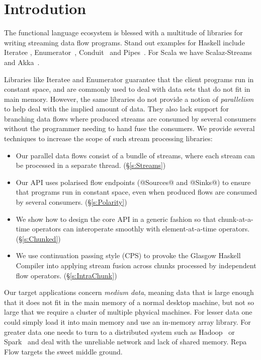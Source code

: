 \section{Introdution}

The functional language ecosystem is blessed with a multitude of libraries for writing streaming data flow programs. Stand out examples for Haskell include Iteratee \cite{Kiselyov:iteratee}, Enumerator~\cite{hackage:enumerator}, Conduit~\cite{hackage:conduit} and Pipes~\cite{hackage:pipes}. For Scala we have Scalaz-Streams~\cite{github:scalaz-streams} and Akka~\cite{github:akka}.

Libraries like Iteratee and Enumerator guarantee that the client programs run in constant space, and are commonly used to deal with data sets that do not fit in main memory. However, the same libraries do not provide a notion of \emph{parallelism} to help deal with the implied amount of data. They also lack support for branching data flows where produced streams are consumed by several consumers without the programmer needing to hand fuse the consumers. We provide several techniques to increase the scope of such stream processing libraries:

\begin{itemize}
\item Our parallel data flows consist of a bundle of streams, where each stream can be processed in a separate thread. (\S\ref{s:Streams})

\item Our API uses polarised flow endpoints (@Sources@ and @Sinks@) to ensure that programs run in constant space, even when produced flows are consumed by several consumers. (\S\ref{s:Polarity})

\item We show how to design the core API in a generic fashion so that chunk-at-a-time operators can interoperate smoothly with element-at-a-time operators. (\S\ref{s:Chunked})

\item We use continuation passing style (CPS) to provoke the Glasgow Haskell Compiler into applying stream fusion across chunks processed by independent flow operators. (\S\ref{s:IntraChunk})



\end{itemize}

Our target applications concern \emph{medium data}, meaning data that is large enough that it does not fit in the main memory of a normal desktop machine, but not so large that we require a cluster of multiple physical machines. For lesser data one could simply load it into main memory and use an in-memory array library. For greater data one needs to turn to a distributed system such as Hadoop~\cite{Shvachko:Hadoop} or Spark~\cite{Zaharia:RDDs} and deal with the unreliable network and lack of shared memory. Repa Flow targets the sweet middle ground.


